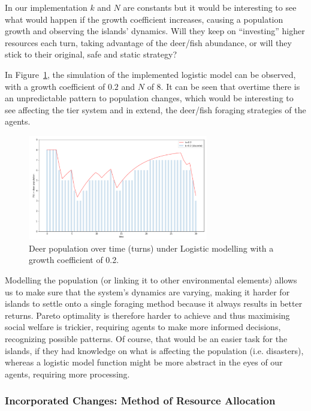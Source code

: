 In our implementation $k$ and $N$ are constants but it would be interesting to see what would happen if the growth coefficient increases, causing a population growth and observing the islands’ dynamics. Will they keep on “investing” higher resources each turn, taking advantage of the deer/fish abundance, or will they stick to their original, safe and static strategy?

In Figure~\ref{fig:Deer population over time}, the simulation of the implemented logistic model can be observed, with a growth coefficient of $0.2$ and $N$ of $8$. It can be seen that overtime there is an unpredictable pattern to population changes, which would be interesting to see affecting the tier system and in extend, the deer/fish foraging strategies of the agents.

\begin{figure}[!htb]
    \centering
    \includegraphics[width=0.7\textwidth]{04_environment/Images/Deer population over time.PNG}
    \caption{Deer population over time (turns) under Logistic modelling with a growth coefficient of 0.2.}
    \label{fig:Deer population over time}
\end{figure}

Modelling the population (or linking it to other environmental elements) allows us to make sure that the system’s dynamics are varying, making it harder for islands to settle onto a single foraging method because it always results in better returns. Pareto optimality is therefore harder to achieve and thus maximising social welfare is trickier, requiring agents to make more informed decisions, recognizing possible patterns. Of course, that would be an easier task for the islands, if they had knowledge on what is affecting the population (i.e. disasters), whereas a logistic model function might be more abstract in the eyes of our agents, requiring more processing. 

\subsubsection{Incorporated Changes: Method of Resource Allocation}

